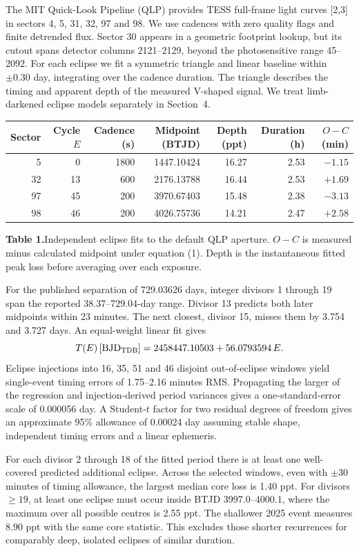\documentclass[11pt,a4paper]{article}
\newcommand{\Sec}[2]{\par\vspace{9pt}\noindent{\large\bfseries\sffamily\color{accent}#1\quad #2}\par\nobreak\vspace{3pt}\noindent\ignorespaces}
\newcommand{\captext}[2]{\par\nobreak\vspace{3pt}\noindent\begin{minipage}{\linewidth}\small\sffamily\raggedright\textbf{#1.}\enspace #2\end{minipage}\par\vspace{4pt}}
\begin{document}
\clearpage
\Sec{2}{Photometry, cycle count and localization}
The MIT Quick-Look Pipeline (QLP) provides TESS full-frame light curves [2,3] in sectors 4, 5, 31, 32, 97 and 98. We use cadences with zero quality flags and finite detrended flux. Sector 30 appears in a geometric footprint lookup, but its cutout spans detector columns 2121--2129, beyond the photosensitive range 45--2092. For each eclipse we fit a symmetric triangle and linear baseline within $\pm0.30$ day, integrating over the cadence duration. The triangle describes the timing and apparent depth of the measured V-shaped signal. We treat limb-darkened eclipse models separately in Section~4.
\begin{center}
\small\renewcommand{\arraystretch}{1.15}
\begin{tabular}{@{}rrrrrrr@{}}\toprule
Sector & Cycle $E$ & Cadence (s) & Midpoint (BTJD) & Depth (ppt) & Duration (h) & $O-C$ (min)\\\midrule
5  & 0  & 1800 & 1447.10424 & 16.27 & 2.53 & $-1.15$\\
32 & 13 & 600  & 2176.13788 & 16.44 & 2.53 & $+1.69$\\
97 & 45 & 200  & 3970.67403 & 15.48 & 2.38 & $-3.13$\\
98 & 46 & 200  & 4026.75736 & 14.21 & 2.47 & $+2.58$\\\bottomrule
\end{tabular}\end{center}
\captext{Table 1}{Independent eclipse fits to the default QLP aperture. $O-C$ is measured minus calculated midpoint under equation (1). Depth is the instantaneous fitted peak loss before averaging over each exposure.}
For the published separation of 729.03626 days, integer divisors 1 through 19 span the reported 38.37--729.04-day range. Divisor 13 predicts both later midpoints within 23 minutes. The next closest, divisor 15, misses them by 3.754 and 3.727 days. An equal-weight linear fit gives
\begin{equation}
T(E)\,[\mathrm{BJD}_{\rm TDB}]=2458447.10503+56.0793594\,E .
\end{equation}
Eclipse injections into 16, 35, 51 and 46 disjoint out-of-eclipse windows yield single-event timing errors of 1.75--2.16 minutes RMS. Propagating the larger of the regression and injection-derived period variances gives a one-standard-error scale of 0.000056 day. A Student-$t$ factor for two residual degrees of freedom gives an approximate 95\% allowance of 0.00024 day assuming stable shape, independent timing errors and a linear ephemeris.
\par For each divisor 2 through 18 of the fitted period there is at least one well-covered predicted additional eclipse. Across the selected windows, even with $\pm30$ minutes of timing allowance, the largest median core loss is 1.40 ppt. For divisors $\geq19$, at least one eclipse must occur inside BTJD 3997.0--4000.1, where the maximum over all possible centres is 2.55 ppt. The shallower 2025 event measures 8.90 ppt with the same core statistic. This excludes those shorter recurrences for comparably deep, isolated eclipses of similar duration.
\end{document}
